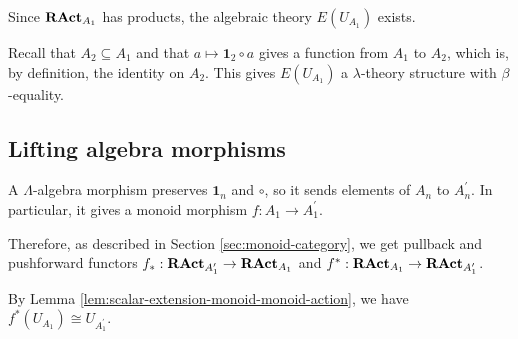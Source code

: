 \begin{definition}
  Since $ \mathbf{RAct}_{A_1} $ has products, the algebraic theory $ E(U_{A_1}) $ exists.

  Recall that $ A_2 \subseteq A_1 $ and that $ a \mapsto \mathbf 1_2 \circ a $ gives a function from $ A_1 $ to $ A_2 $, which is, by definition, the identity on $ A_2 $. This gives $ E(U_{A_1}) $ a $ \lambda $-theory structure with $ \beta $-equality.
\end{definition}


\subsection{Lifting algebra morphisms}

\begin{definition}
  A $ \Lambda $-algebra morphism preserves $ \mathbf 1_n $ and $ \circ $, so it sends elements of $ A_n $ to $ A^\prime_n $. In particular, it gives a monoid morphism $ f: A_1 \to A^\prime_1 $.

  Therefore, as described in Section \ref{sec:monoid-category}, we get pullback and pushforward functors $ f_*: \mathbf{RAct}_{A^\prime_1} \to \mathbf{RAct}_{A_1} $ and $ f^* : \mathbf{RAct}_{A_1} \to \mathbf{RAct}_{A^\prime_1} $.
\end{definition}

\begin{remark}
  By Lemma \ref{lem:scalar-extension-monoid-monoid-action}, we have $ f^*(U_{A_1}) \cong U_{A^\prime_1} $.
\end{remark}

